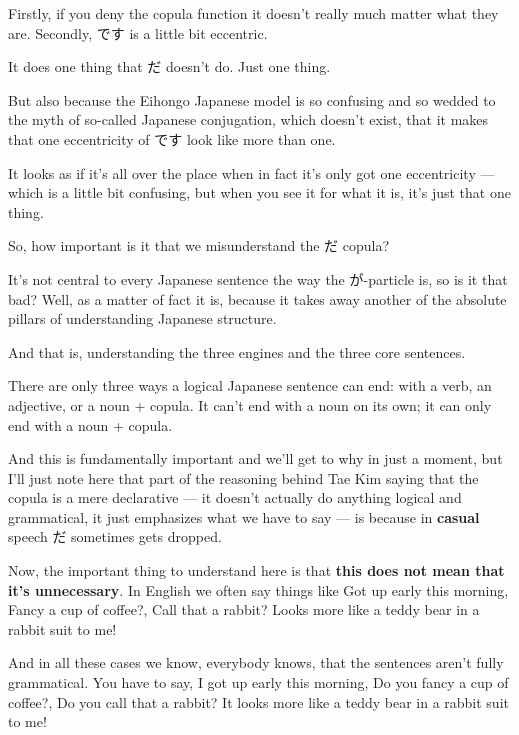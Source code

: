 {}

Firstly, if you deny the copula function it doesn't really much matter what they are. Secondly, です is a little bit eccentric.

It does one thing that だ doesn't do. Just one thing.

But also because the Eihongo Japanese model is so confusing and so wedded to the myth of so-called Japanese conjugation, which doesn't exist, that it makes that one eccentricity of です look like more than one.

\thinrule

It looks as if it's all over the place when in fact it's only got one eccentricity --- which is a little bit confusing, but when you see it for what it is, it's just that one thing.

So, how important is it that we misunderstand the だ copula?

{}

It's not central to every Japanese sentence the way the が-particle is, so is it that bad? Well, as a matter of fact it is, because it takes away another of the absolute pillars of understanding Japanese structure.

And that is, understanding the three engines and the three core sentences.

\thinrule

There are only three ways a logical Japanese sentence can end: with a verb, an adjective, or a noun + copula. It can't end with a noun on its own; it can only end with a noun + copula.

And this is fundamentally important and we'll get to why in just a moment, but I'll just note here that part of the reasoning behind Tae Kim saying that the copula is a mere declarative --- it doesn't actually do anything logical and grammatical, it just emphasizes what we have to say --- is because in {\bf casual} speech だ sometimes gets dropped.

Now, the important thing to understand here is that {\bf this does not mean that it's unnecessary}. In English we often say things like Got up early this morning, Fancy a cup of coffee?, Call that a rabbit? Looks more like a teddy bear in a rabbit suit to me!

And in all these cases we know, everybody knows, that the sentences aren't fully grammatical. You have to say, I got up early this morning, Do you fancy a cup of coffee?, Do you call that a rabbit? It looks more like a teddy bear in a rabbit suit to me!


